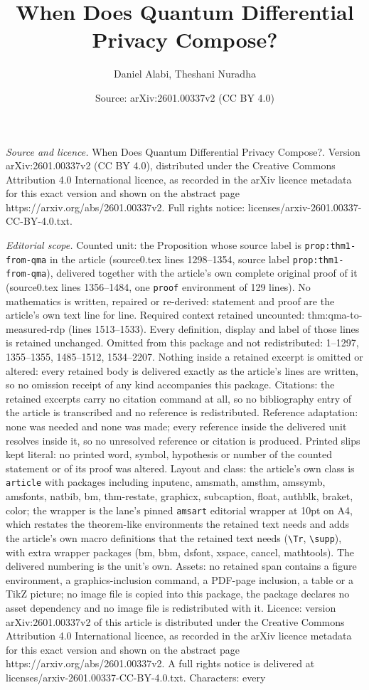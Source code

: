 \documentclass[10pt,a4paper]{amsart}
\title[When Does Quantum Differential Privacy Compose?]{When Does Quantum Differential Privacy Compose?}
\author{Daniel Alabi, Theshani Nuradha}
\date{Source: arXiv:2601.00337v2 (CC BY 4.0)}
\begin{document}
\maketitle

\noindent\emph{Source and licence.} When Does Quantum Differential Privacy Compose?. Version arXiv:2601.00337v2 (CC BY 4.0), distributed under the Creative Commons Attribution 4.0 International licence, as recorded in the arXiv licence metadata for this exact version and shown on the abstract page https://arxiv.org/abs/2601.00337v2. Full rights notice: licenses/arxiv-2601.00337-CC-BY-4.0.txt.\par\smallskip

\noindent\textit{Editorial scope.} Counted unit: the Proposition whose source label is \texttt{prop:thm1-from-qma} in the article (source0.tex lines 1298--1354, source label \texttt{prop:thm1-from-qma}), delivered together with the article's own complete original proof of it (source0.tex lines 1356--1484, one \texttt{proof} environment of 129 lines). No mathematics is written, repaired or re-derived: statement and proof are the article's own text line for line. Required context retained uncounted: thm:qma-to-measured-rdp (lines 1513--1533). Every definition, display and label of those lines is retained unchanged. Omitted from this package and not redistributed: 1--1297, 1355--1355, 1485--1512, 1534--2207. Nothing inside a retained excerpt is omitted or altered: every retained body is delivered exactly as the article's lines are written, so no omission receipt of any kind accompanies this package. Citations: the retained excerpts carry no citation command at all, so no bibliography entry of the article is transcribed and no reference is redistributed. Reference adaptation: none was needed and none was made; every reference inside the delivered unit resolves inside it, so no unresolved reference or citation is produced. Printed slips kept literal: no printed word, symbol, hypothesis or number of the counted statement or of its proof was altered. Layout and class: the article's own class is \texttt{article} with packages including inputenc, amsmath, amsthm, amssymb, amsfonts, natbib, bm, thm-restate, graphicx, subcaption, float, authblk, braket, color; the wrapper is the lane's pinned \texttt{amsart} editorial wrapper at 10pt on A4, which restates the theorem-like environments the retained text needs and adds the article's own macro definitions that the retained text needs (\texttt{\textbackslash Tr}, \texttt{\textbackslash supp}), with extra wrapper packages (bm, bbm, dsfont, xspace, cancel, mathtools). The delivered numbering is the unit's own. Assets: no retained span contains a figure environment, a graphics-inclusion command, a PDF-page inclusion, a table or a TikZ picture; no image file is copied into this package, the package declares no asset dependency and no image file is redistributed with it. Licence: version arXiv:2601.00337v2 of this article is distributed under the Creative Commons Attribution 4.0 International licence, as recorded in the arXiv licence metadata for this exact version and shown on the abstract page https://arxiv.org/abs/2601.00337v2. A full rights notice is delivered at licenses/arxiv-2601.00337-CC-BY-4.0.txt. Characters: every 
\end{document}
